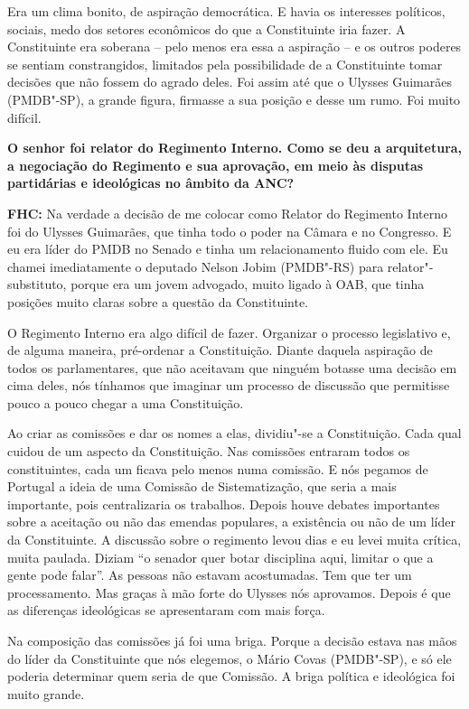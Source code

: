 Era um clima bonito, de aspiração democrática. E havia os interesses
políticos, sociais, medo dos setores econômicos do que a Constituinte
iria fazer. A Constituinte era soberana -- pelo menos era essa a
aspiração -- e os outros poderes se sentiam constrangidos, limitados
pela possibilidade de a Constituinte tomar decisões que não fossem do
agrado deles. Foi assim até que o Ulysses Guimarães (PMDB"-SP), a grande
figura, firmasse a sua posição e desse um rumo. Foi muito difícil.

\textbf{O senhor foi relator do Regimento Interno. Como se deu a
arquitetura, a negociação do Regimento e sua aprovação, em meio às
disputas partidárias e ideológicas no âmbito da ANC?}

\textbf{FHC:} Na verdade a decisão de me colocar como Relator do
Regimento Interno foi do Ulysses Guimarães, que tinha todo o poder na
Câmara e no Congresso. E eu era líder do PMDB no Senado e tinha um
relacionamento fluido com ele. Eu chamei imediatamente o deputado Nelson
Jobim (PMDB"-RS) para relator"-substituto, porque era um jovem advogado,
muito ligado à OAB, que tinha posições muito claras sobre a questão da
Constituinte.

O Regimento Interno era algo difícil de fazer. Organizar o processo
legislativo e, de alguma maneira, pré-ordenar a Constituição. Diante
daquela aspiração de todos os parlamentares, que não aceitavam que
ninguém botasse uma decisão em cima deles, nós tínhamos que imaginar um
processo de discussão que permitisse pouco a pouco chegar a uma
Constituição.

Ao criar as comissões e dar os nomes a elas, dividiu"-se a Constituição.
Cada qual cuidou de um aspecto da Constituição. Nas comissões entraram
todos os constituintes, cada um ficava pelo menos numa comissão. E nós
pegamos de Portugal a ideia de uma Comissão de Sistematização, que seria
a mais importante, pois centralizaria os trabalhos. Depois houve debates
importantes sobre a aceitação ou não das emendas populares, a existência
ou não de um líder da Constituinte. A discussão sobre o regimento levou
dias e eu levei muita crítica, muita paulada. Diziam ``o senador quer
botar disciplina aqui, limitar o que a gente pode falar''. As pessoas
não estavam acostumadas. Tem que ter um processamento. Mas graças à mão
forte do Ulysses nós aprovamos. Depois é que as diferenças ideológicas
se apresentaram com mais força.

Na composição das comissões já foi uma briga. Porque a decisão estava
nas mãos do líder da Constituinte que nós elegemos, o Mário Covas
(PMDB"-SP), e só ele poderia determinar quem seria de que Comissão. A
briga política e ideológica foi muito grande.

